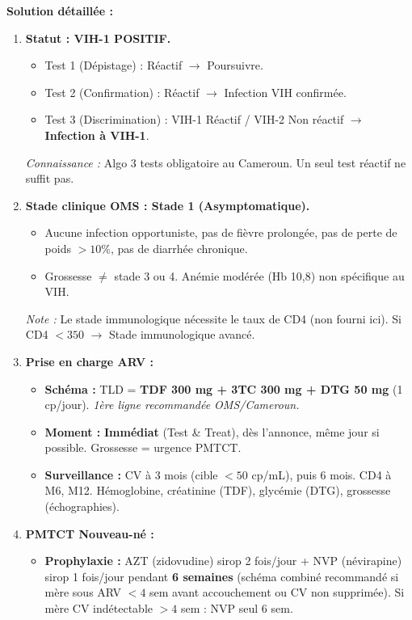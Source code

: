 \documentclass[11pt]{article}
\begin{document}
\begin{exoresolu}
\tcblower
\textbf{Solution détaillée :}
\begin{enumerate}
\item \textbf{Statut : VIH-1 POSITIF.}
    \begin{itemize}
    \item Test 1 (Dépistage) : Réactif $\to$ Poursuivre.
    \item Test 2 (Confirmation) : Réactif $\to$ Infection VIH confirmée.
    \item Test 3 (Discrimination) : VIH-1 Réactif / VIH-2 Non réactif $\to$ \textbf{Infection à VIH-1}.
    \end{itemize}
    \textit{Connaissance :} Algo 3 tests obligatoire au Cameroun. Un seul test réactif ne suffit pas.
\item \textbf{Stade clinique OMS : Stade 1 (Asymptomatique).}
    \begin{itemize}
    \item Aucune infection opportuniste, pas de fièvre prolongée, pas de perte de poids $> 10\%$, pas de diarrhée chronique.
    \item Grossesse $\neq$ stade 3 ou 4. Anémie modérée (Hb 10,8) non spécifique au VIH.
    \end{itemize}
    \textit{Note :} Le stade immunologique nécessite le taux de CD4 (non fourni ici). Si CD4 $< 350$ $\to$ Stade immunologique avancé.
\item \textbf{Prise en charge ARV :}
    \begin{itemize}
    \item \textbf{Schéma :} TLD = \textbf{TDF 300 mg + 3TC 300 mg + DTG 50 mg} (1 cp/jour). \textit{1ère ligne recommandée OMS/Cameroun.}
    \item \textbf{Moment :} \textbf{Immédiat} (Test \& Treat), dès l'annonce, même jour si possible. Grossesse = urgence PMTCT.
    \item \textbf{Surveillance :} CV à 3 mois (cible $< 50$ cp/mL), puis 6 mois. CD4 à M6, M12. Hémoglobine, créatinine (TDF), glycémie (DTG), grossesse (échographies).
    \end{itemize}
\item \textbf{PMTCT Nouveau-né :}
    \begin{itemize}
    \item \textbf{Prophylaxie :} AZT (zidovudine) sirop 2 fois/jour + NVP (névirapine) sirop 1 fois/jour pendant \textbf{6 semaines} (schéma combiné recommandé si mère sous ARV $< 4$ sem avant accouchement ou CV non supprimée). Si mère CV indétectable $> 4$ sem : NVP seul 6 sem.

\end{itemize}
\end{enumerate}
\end{exoresolu}
\end{document}
